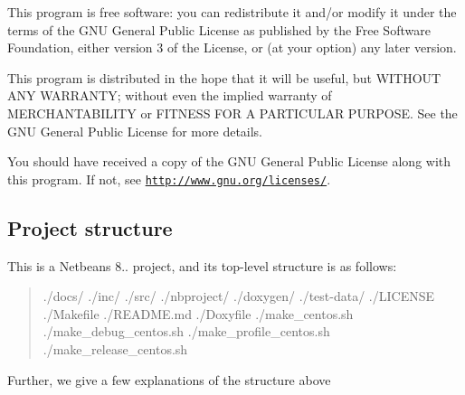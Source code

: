 This program is free software\+: you can redistribute it and/or modify it under the terms of the G\+N\+U General Public License as published by the Free Software Foundation, either version 3 of the License, or (at your option) any later version.

This program is distributed in the hope that it will be useful, but W\+I\+T\+H\+O\+U\+T A\+N\+Y W\+A\+R\+R\+A\+N\+T\+Y; without even the implied warranty of M\+E\+R\+C\+H\+A\+N\+T\+A\+B\+I\+L\+I\+T\+Y or F\+I\+T\+N\+E\+S\+S F\+O\+R A P\+A\+R\+T\+I\+C\+U\+L\+A\+R P\+U\+R\+P\+O\+S\+E. See the G\+N\+U General Public License for more details.

You should have received a copy of the G\+N\+U General Public License along with this program. If not, see \href{http://www.gnu.org/licenses/}{\tt http\+://www.\+gnu.\+org/licenses/}.

\subsection*{Project structure}

This is a Netbeans 8.. project, and its\textquotesingle{} top-\/level structure is as follows\+:

\begin{quote}
./docs/ ./inc/ ./src/ ./nbproject/ ./doxygen/ ./test-\/data/ ./\+L\+I\+C\+E\+N\+S\+E ./\+Makefile ./\+R\+E\+A\+D\+M\+E.md ./\+Doxyfile ./make\+\_\+centos.sh ./make\+\_\+debug\+\_\+centos.sh ./make\+\_\+profile\+\_\+centos.sh ./make\+\_\+release\+\_\+centos.sh \end{quote}


Further, we give a few explanations of the structure above


